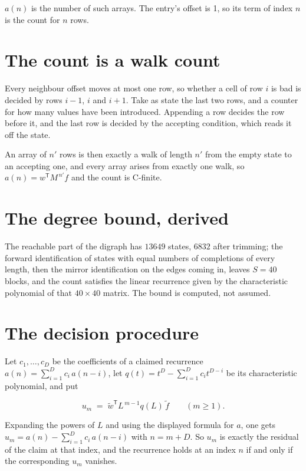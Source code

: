 \documentclass[11pt]{article}
\theoremstyle{definition}
\begin{document}
$a(n)$ is the number of such arrays. The entry's offset is 1, so its term of index $n$ is the count for $n$ rows.

\section{The count is a walk count}

Every neighbour offset moves at most one row, so whether a cell of row $i$ is bad is decided by rows $i-1$, $i$ and $i+1$. Take as state the last two rows, and a counter for how many values have been introduced. Appending a row decides the row before it, and the last row is decided by the accepting condition, which reads it off the state.

An array of $n'$ rows is then exactly a walk of length $n'$ from the empty state to an accepting one, and every array arises from exactly one walk, so $a(n) = w^{\mathsf T}M^{\,n'}f$ and the count is C-finite.

\section{The degree bound, derived}

The reachable part of the digraph has $13649$ states, $6832$ after trimming; the forward identification of states with equal numbers of completions of every length, then the mirror identification on the edges coming in, leaves $S = 40$ blocks, and the count satisfies the linear recurrence given by the characteristic polynomial of that $40\times40$ matrix. The bound is computed, not assumed.

\section{The decision procedure}

Let $c_1,\dots,c_D$ be the coefficients of a claimed recurrence $a(n) = \sum_{i=1}^{D} c_i\,a(n-i)$, let $q(t) = t^{D} - \sum_{i=1}^{D} c_i t^{D-i}$ be its characteristic polynomial, and put

\[u_m \;=\; \tilde w^{\mathsf T} L^{\,m-1} q(L)\,\tilde f \qquad (m \ge 1).\]

Expanding the powers of $L$ and using the displayed formula for $a$, one gets $u_m = a(n) - \sum_{i=1}^{D} c_i\,a(n-i)$ with $n = m + D$. So $u_m$ is exactly the residual of the claim at that index, and the recurrence holds at an index $n$ if and only if the corresponding $u_m$ vanishes.
\end{document}
